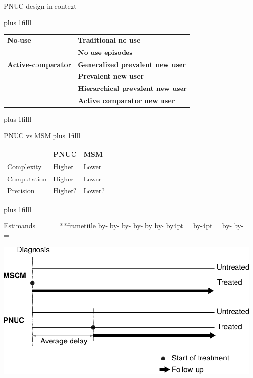 \documentclass[aspectratio=169,12pt]{beamer} %
\makeatletter
\newif\ifsidebartheme
\newcommand*{\calculatespace}{%
    \contentheight=\paperheight%
    \ifx\beamer@frametitle\@empty%
        \setbox\@tempboxa=\box\voidb@x%
      \else%
        \setbox\@tempboxa=\vbox{%
          \vbox{}%
          {\parskip0pt\usebeamertemplate***{frametitle}}%
        }%
        \ifsidebartheme%
          \advance\contentheight by-1em%
        \fi%
      \fi%
    \advance\contentheight by-\ht\@tempboxa%
    \advance\contentheight by-\dp\@tempboxa%
    \advance\contentheight by-\beamer@frametopskip%
    \ifbeamer@plainframe%
    \contentbottom=0pt%
    \else%
    \advance\contentheight by-\headheight%
    \advance\contentheight by\headdp%
    \advance\contentheight by-\footheight%
    \advance\contentheight by4pt%
    \contentbottom=\footheight%
    \advance\contentbottom by-4pt%
    \fi%
    \contentwidth=\paperwidth%
    \ifbeamer@plainframe%
    \contentleft=0pt%
    \else%
    \advance\contentwidth by-\beamer@rightsidebar%
    \advance\contentwidth by-\beamer@leftsidebar\relax%
    \contentleft=\beamer@leftsidebar%
    \fi%
}
\makeatother
\begin{document}
\begin{frame}{PNUC design in context}
%
\vskip0pt plus 1filll
	\centering
	\begin{tabular}{ll}
	\hline
		\bf{No-use} & \bf{Traditional no use} \\
		& \bf{No use episodes} \\
	\hline
		\bf{Active-comparator}  & \bf{Generalized prevalent new user} \\
		& \alert{\bf{Prevalent new user}} \\
		& \bf{Hierarchical prevalent new user} \\
		& \bf{Active comparator new user} \\
	\hline
	\end{tabular}
\vskip0pt plus 1filll
\end{frame}

\begin{frame}{PNUC vs MSM}
\vskip0pt plus 1filll
	\centering
	\begin{tabular}{lll}
	\hline
		& PNUC & MSM \\
	\hline
		Complexity & Higher & Lower \\
		Computation & Higher & Lower \\
		Precision & Higher? & Lower? \\
	\hline
	\end{tabular}
\vskip0pt plus 1filll
\end{frame}

\begin{frame}{Estimands}
    \calculatespace%
    \begin{center}
	\includegraphics[height=0.95\contentheight]{ref/estimands.pdf}
    \end{center}
\end{frame}
\end{document}
